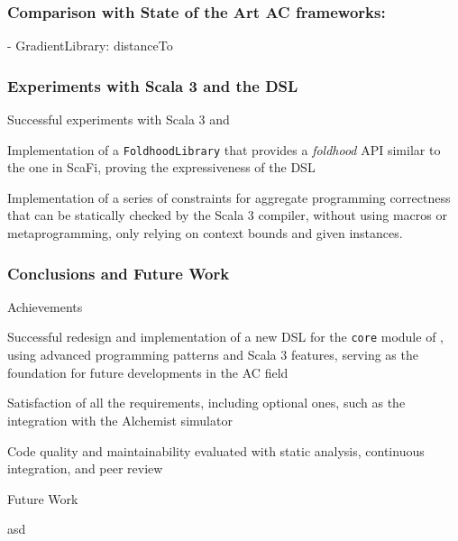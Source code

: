 \begin{frame}
    \frametitle{Comparison with State of the Art \ac{AC} frameworks: \this}
    \begin{exampleblock}{\this - GradientLibrary: distanceTo}
        
    \end{exampleblock}
\end{frame}

\begin{frame}
    \frametitle{Experiments with Scala 3 and the \ac{DSL}}
    \begin{blockitems}{Successful experiments with Scala 3 and \this}
        \item Implementation of a \texttt{FoldhoodLibrary} that provides a \textit{foldhood} \ac{API} similar to the one in ScaFi, proving the expressiveness of the \this \ac{DSL}
        \item Implementation of a series of constraints for aggregate programming correctness that can be statically checked by the Scala 3 compiler, without using macros or metaprogramming, only relying on context bounds and given instances.
    \end{blockitems}
\end{frame}

\begin{frame}
    \frametitle{Conclusions and Future Work}
    \begin{blockitems}{Achievements}
        \item Successful redesign and implementation of a new \ac{DSL} for the \texttt{core} module of \this, using advanced programming patterns and Scala 3 features, serving as the foundation for future developments in the \ac{AC} field
        \item Satisfaction of all the requirements, including optional ones, such as the integration with the Alchemist simulator
        \item Code quality and maintainability evaluated with static analysis, continuous integration, and peer review
    \end{blockitems}
    \begin {blockitems}{Future Work}
        \item asd
    \end{blockitems}
\end{frame}

